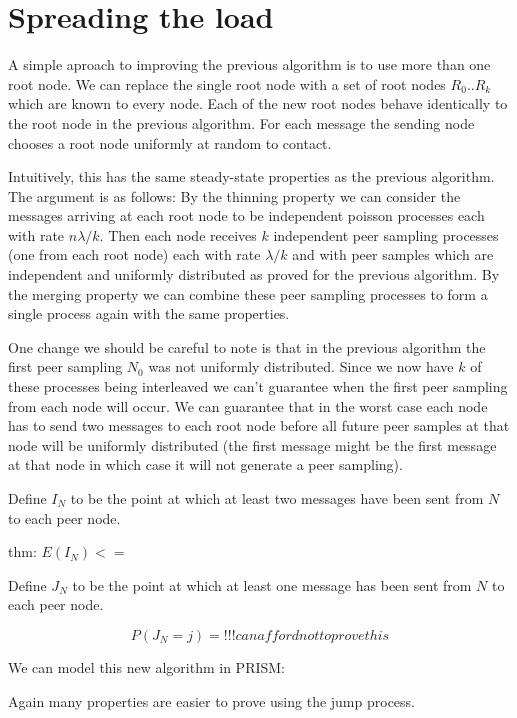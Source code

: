 \documentclass[a4paper,10pt]{article}
\newcommand{\prismmodel}[1]{
  \begin{quotation}
  \footnotesize
  
  \end{quotation}
}
\begin{document}
\section{Spreading the load}

A simple aproach to improving the previous algorithm is to use more than one root node. We can replace the single root node with a set of root nodes $R_0 .. R_k$ which are known to every node. Each of the new root nodes behave identically to the root node in the previous algorithm. For each message the sending node chooses a root node uniformly at random to contact. 

Intuitively, this has the same steady-state properties as the previous algorithm. The argument is as follows: By the thinning property we can consider the messages arriving at each root node to be independent poisson processes each with rate $n \lambda / k$. Then each node receives $k$ independent peer sampling processes (one from each root node) each with rate $\lambda / k$ and with peer samples which are independent and uniformly distributed as proved for the previous algorithm. By the merging property we can combine these peer sampling processes to form a single process again with the same properties. 

One change we should be careful to note is that in the previous algorithm the first peer sampling $N_0$ was not uniformly distributed. Since we now have $k$ of these processes being interleaved we can't guarantee when the first peer sampling from each node will occur. We can guarantee that in the worst case each node has to send two messages to each root node before all future peer samples at that node will be uniformly distributed (the first message might be the first message at that node in which case it will not generate a peer sampling).

Define $I_N$ to be the point at which at least two messages have been sent from $N$ to each peer node.

thm: $E(I_N) <=$ 

Define $J_N$ to be the point at which at least one message has been sent from $N$ to each peer node.

$$
P(J_N = j)
= !!! can afford not to prove this
$$
 
We can model this new algorithm in PRISM:

\prismmodel{ctmc_multiple}

Again many properties are easier to prove using the jump process.

\prismmodel{dtmc_multiple}
\end{document}
